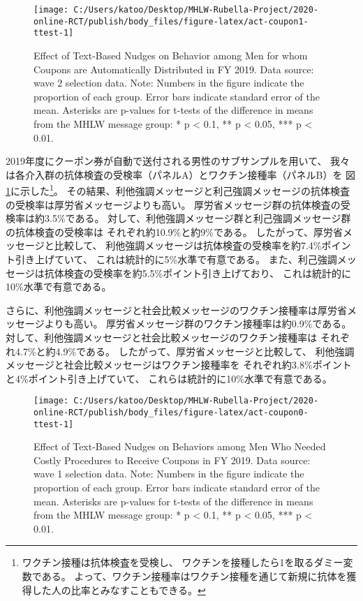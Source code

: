 \documentclass[
  11pt,
  a4paper,
]{article}
\begin{document}
\begin{figure}[t]
\texttt{[image: C:/Users/katoo/Desktop/MHLW-Rubella-Project/2020-online-RCT/publish/body\_files/figure-latex/act-coupon1-ttest-1]} \caption{Effect of Text-Based Nudges on Behavior among Men for whom Coupons are Automatically Distributed in FY 2019. Data source: wave 2 selection data. Note: Numbers in the figure indicate the proportion of each group. Error bars indicate standard error of the mean. Asterisks are p-values for t-tests of the difference in means from the MHLW message group: * p < 0.1, ** p < 0.05, *** p < 0.01.}\label{fig:act-coupon1-ttest}
\end{figure}

2019年度にクーポン券が自動で送付される男性のサブサンプルを用いて、
我々は各介入群の抗体検査の受検率（パネルA）とワクチン接種率（パネルB）を
図\ref{fig:act-coupon1-ttest}に示した\footnote{ワクチン接種は抗体検査を受検し、
  ワクチンを接種したら1を取るダミー変数である。
  よって、ワクチン接種率はワクチン接種を通じて新規に抗体を獲得した人の比率とみなすこともできる。}。
その結果、利他強調メッセージと利己強調メッセージの抗体検査の受検率は厚労省メッセージよりも高い。
厚労省メッセージ群の抗体検査の受検率は約3.5\%である。
対して、利他強調メッセージ群と利己強調メッセージ群の抗体検査の受検率は
それぞれ約10.9\%と約9\%である。
したがって、厚労省メッセージと比較して、
利他強調メッセージは抗体検査の受検率を約7.4\%ポイント引き上げていて、
これは統計的に5\%水準で有意である。
また、利己強調メッセージは抗体検査の受検率を約5.5\%ポイント引き上げており、
これは統計的に10\%水準で有意である。

さらに、利他強調メッセージと社会比較メッセージのワクチン接種率は厚労省メッセージよりも高い。
厚労省メッセージ群のワクチン接種率は約0.9\%である。
対して、利他強調メッセージと社会比較メッセージのワクチン接種率は
それぞれ4.7\%と約4.9\%である。
したがって、厚労省メッセージと比較して、
利他強調メッセージと社会比較メッセージはワクチン接種率を
それぞれ約3.8\%ポイントと4\%ポイント引き上げていて、
これらは統計的に10\%水準で有意である。

\begin{figure}[t]
\texttt{[image: C:/Users/katoo/Desktop/MHLW-Rubella-Project/2020-online-RCT/publish/body\_files/figure-latex/act-coupon0-ttest-1]} \caption{Effect of Text-Based Nudges on Behaviors among Men Who Needed Costly Procedures to Receive Coupons in FY 2019. Data source: wave 1 selection data. Note: Numbers in the figure indicate the proportion of each group. Error bars indicate standard error of the mean. Asterisks are p-values for t-tests of the difference in means from the MHLW message group: * p < 0.1, ** p < 0.05, *** p < 0.01.}\label{fig:act-coupon0-ttest}
\end{figure}
\end{document}
